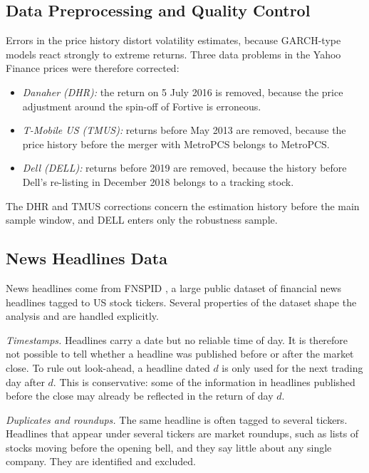 \documentclass[12pt,a4paper]{article}
\begin{document}
\subsection{Data Preprocessing and Quality Control}\label{sec:data-quality}
Errors in the price history distort volatility estimates, because GARCH-type models react strongly to extreme returns. Three data problems in the Yahoo Finance prices were therefore corrected:
\begin{itemize}
  \item \emph{Danaher (DHR):} the return on 5 July 2016 is removed, because the price adjustment around the spin-off of Fortive is erroneous.
  \item \emph{T-Mobile US (TMUS):} returns before May 2013 are removed, because the price history before the merger with MetroPCS belongs to MetroPCS.
  \item \emph{Dell (DELL):} returns before 2019 are removed, because the history before Dell's re-listing in December 2018 belongs to a tracking stock.
\end{itemize}
The DHR and TMUS corrections concern the estimation history before the main sample window, and DELL enters only the robustness sample.

\subsection{News Headlines Data}\label{sec:data-news}
News headlines come from FNSPID \parencite{dong2024}, a large public dataset of financial news headlines tagged to US stock tickers. Several properties of the dataset shape the analysis and are handled explicitly.

\emph{Timestamps.} Headlines carry a date but no reliable time of day. It is therefore not possible to tell whether a headline was published before or after the market close. To rule out look-ahead, a headline dated $d$ is only used for the next trading day after $d$. This is conservative: some of the information in headlines published before the close may already be reflected in the return of day $d$.

\emph{Duplicates and roundups.} The same headline is often tagged to several tickers. Headlines that appear under several tickers are market roundups, such as lists of stocks moving before the opening bell, and they say little about any single company. They are identified and excluded.
\end{document}

